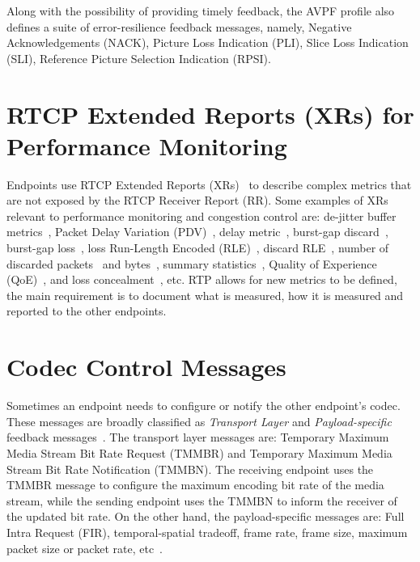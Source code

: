 Along with the possibility of providing timely feedback, the AVPF profile also
defines a suite of error-resilience feedback messages, namely, Negative
Acknowledgements (NACK), Picture Loss Indication (PLI), Slice Loss Indication
(SLI), Reference Picture Selection Indication (RPSI).

\section{RTCP Extended Reports (XRs) for Performance Monitoring}

Endpoints use RTCP Extended Reports (XRs)~\cite{rfc3611} to describe complex
metrics that are not exposed by the RTCP Receiver Report (RR). Some examples
of XRs relevant to performance monitoring and congestion control are:
de-jitter buffer metrics~\cite{draft.xr.jb}, Packet Delay Variation
(PDV)~\cite{rfc6798}, delay metric~\cite{rfc6843}, burst-gap discard~\cite{
draft.xr.bg.discard}, burst-gap loss~\cite{rfc6958}, loss Run-Length Encoded
(RLE)~\cite{rfc3611}, discard RLE~\cite{draft.xr.discard.rle}, number of
discarded packets~\cite{draft.xr.discard} and
bytes~\cite{draft.xr.bytes.discarded}, summary
statistics~\cite{draft.xr.stat}, Quality of Experience
(QoE)~\cite{draft.xr.qoe}, and loss concealment~\cite{draft.xr.conceal}, etc.
RTP allows for new metrics to be defined, the main requirement is to document
what is measured, how it is measured and reported to the other endpoints.




\section{Codec Control Messages}

Sometimes an endpoint needs to configure or notify the other endpoint's codec.
These messages are broadly classified as \emph{Transport Layer} and \emph
{Payload-specific} feedback messages~\cite{rfc5104}. The transport layer
messages are: Temporary Maximum Media Stream Bit Rate Request (TMMBR) and
Temporary Maximum Media Stream Bit Rate Notification (TMMBN). The receiving
endpoint uses the TMMBR message to configure the maximum encoding bit rate of
the media stream, while the sending endpoint uses the TMMBN to inform the
receiver of the updated bit rate. On the other hand, the payload-specific
messages are: Full Intra Request (FIR), temporal-spatial tradeoff, frame
rate, frame size, maximum packet size or packet rate,
etc~\cite{draft.avt.cop}.

